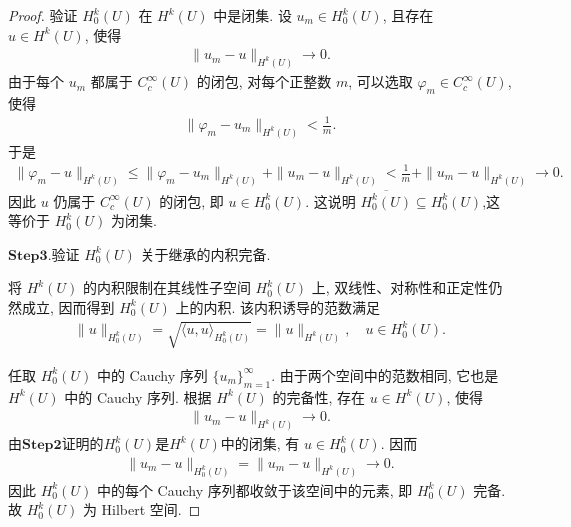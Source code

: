 \documentclass[../../main.tex]{subfiles}
\begin{document}
\begin{proof}
验证 $H_0^k(U)$ 在 $H^k(U)$ 中是闭集.
设 $u_m\in H_0^k(U)$, 且存在 $u\in H^k(U)$, 使得
\begin{align*}
\|u_m-u\|_{H^k(U)}\longrightarrow 0.
\end{align*}
由于每个 $u_m$ 都属于 $C_c^\infty(U)$ 的闭包, 对每个正整数 $m$, 可以选取 $\varphi_m\in C_c^\infty(U)$, 使得
\begin{align*}
\|\varphi_m-u_m\|_{H^k(U)}<\frac{1}{m}.
\end{align*}
于是
\begin{align*}
\|\varphi_m-u\|_{H^k(U)}
\leqslant
\|\varphi_m-u_m\|_{H^k(U)}
+
\|u_m-u\|_{H^k(U)}
<
\frac{1}{m}+\|u_m-u\|_{H^k(U)}
\longrightarrow 0.
\end{align*}
因此 $u$ 仍属于 $C_c^\infty(U)$ 的闭包, 即 $u\in H_0^k(U)$.
这说明 $\overline{H_0^k(U)}\subseteq H_0^k(U)$,这等价于 $H_0^k(U)$ 为闭集.

\noindent$\mathbf{Step}\mathbf{3}.${\heiti 验证 $H_0^k(U)$ 关于继承的内积完备.}

将 $H^k(U)$ 的内积限制在其线性子空间 $H_0^k(U)$ 上, 双线性、对称性和正定性仍然成立, 因而得到 $H_0^k(U)$ 上的内积. 该内积诱导的范数满足
\begin{align*}
\|u\|_{H_0^k(U)}
=
\sqrt{\langle u,u\rangle_{H_0^k(U)}}
=
\|u\|_{H^k(U)},
\quad u\in H_0^k(U).
\end{align*}

任取 $H_0^k(U)$ 中的 Cauchy 序列 $\{u_m\}_{m=1}^{\infty}$. 由于两个空间中的范数相同, 它也是 $H^k(U)$ 中的 Cauchy 序列. 根据 $H^k(U)$ 的完备性, 存在 $u\in H^k(U)$, 使得
\begin{align*}
\|u_m-u\|_{H^k(U)}\longrightarrow 0.
\end{align*}
由$\mathbf{Step}\mathbf{2}$证明的$H_0^k(U)$是$H^k(U)$中的闭集, 有 $u\in H_0^k(U)$. 因而
\begin{align*}
\|u_m-u\|_{H_0^k(U)}
=
\|u_m-u\|_{H^k(U)}
\longrightarrow 0.
\end{align*}
因此 $H_0^k(U)$ 中的每个 Cauchy 序列都收敛于该空间中的元素, 即 $H_0^k(U)$ 完备. 故 $H_0^k(U)$ 为 Hilbert 空间.
\end{proof}
\end{document}
